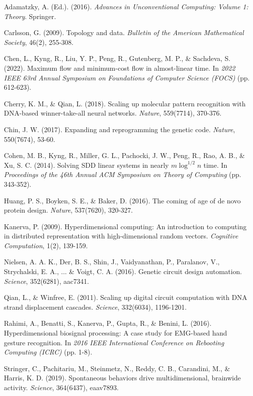 \documentclass[12pt]{article}
\begin{document}

\begin{thebibliography}{99}

Adamatzky, A. (Ed.). (2016). \textit{Advances in Unconventional Computing: Volume 1: Theory}. Springer.

Carlsson, G. (2009). Topology and data. \textit{Bulletin of the American Mathematical Society}, 46(2), 255-308.

Chen, L., Kyng, R., Liu, Y. P., Peng, R., Gutenberg, M. P., \& Sachdeva, S. (2022). Maximum flow and minimum-cost flow in almost-linear time. In \textit{2022 IEEE 63rd Annual Symposium on Foundations of Computer Science (FOCS)} (pp. 612-623).

Cherry, K. M., \& Qian, L. (2018). Scaling up molecular pattern recognition with DNA-based winner-take-all neural networks. \textit{Nature}, 559(7714), 370-376.

Chin, J. W. (2017). Expanding and reprogramming the genetic code. \textit{Nature}, 550(7674), 53-60.

Cohen, M. B., Kyng, R., Miller, G. L., Pachocki, J. W., Peng, R., Rao, A. B., \& Xu, S. C. (2014). Solving SDD linear systems in nearly $m\log^{1/2}n$ time. In \textit{Proceedings of the 46th Annual ACM Symposium on Theory of Computing} (pp. 343-352).

Huang, P. S., Boyken, S. E., \& Baker, D. (2016). The coming of age of de novo protein design. \textit{Nature}, 537(7620), 320-327.

Kanerva, P. (2009). Hyperdimensional computing: An introduction to computing in distributed representation with high-dimensional random vectors. \textit{Cognitive Computation}, 1(2), 139-159.

Nielsen, A. A. K., Der, B. S., Shin, J., Vaidyanathan, P., Paralanov, V., Strychalski, E. A., ... \& Voigt, C. A. (2016). Genetic circuit design automation. \textit{Science}, 352(6281), aac7341.

Qian, L., \& Winfree, E. (2011). Scaling up digital circuit computation with DNA strand displacement cascades. \textit{Science}, 332(6034), 1196-1201.

Rahimi, A., Benatti, S., Kanerva, P., Gupta, R., \& Benini, L. (2016). Hyperdimensional biosignal processing: A case study for EMG-based hand gesture recognition. In \textit{2016 IEEE International Conference on Rebooting Computing (ICRC)} (pp. 1-8).

Stringer, C., Pachitariu, M., Steinmetz, N., Reddy, C. B., Carandini, M., \& Harris, K. D. (2019). Spontaneous behaviors drive multidimensional, brainwide activity. \textit{Science}, 364(6437), eaav7893.

\end{thebibliography}
\end{document}
